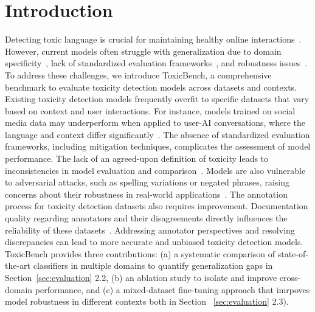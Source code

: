 \section{Introduction}
Detecting toxic language is crucial for maintaining healthy online interactions~\cite{schmidt-wiegand-2017-survey, mishra2020tacklingonlineabusesurvey}. However, current models often struggle with generalization due to domain specificity~\cite{niven-kao-2019-probing, ToxicChat}, lack of standardized evaluation frameworks~\cite{poletto2021resources, sap-etal-2019-risk}, and robustness issues~\cite{Hatecheck, hosseini2017deceiving}. To address these challenges, we introduce ToxicBench, a comprehensive benchmark to evaluate toxicity detection models across datasets and contexts.\newline
Existing toxicity detection models frequently overfit to specific datasets that vary based on context and user interactions. For instance, models trained on social media data may underperform when applied to user-AI conversations, where the language and context differ significantly~\cite{ToxicChat}.\newline
The absence of standardized evaluation frameworks, including mitigation techniques, complicates the assessment of model performance. The lack of an agreed-upon definition of toxicity leads to inconsistencies in model evaluation and comparison~\cite{poletto2021resources}. Models are also vulnerable to adversarial attacks, such as spelling variations or negated phrases, raising concerns about their robustness in real-world applications~\cite{hosseini2017deceiving}.\newline
The annotation process for toxicity detection datasets also requires improvement. Documentation quality regarding annotators and their disagreements directly influences the reliability of these datasets~\cite{waseem-2016-racist, sap-etal-2019-risk}. Addressing annotator perspectives and resolving discrepancies can lead to more accurate and unbiased toxicity detection models.\newline
ToxicBench provides three contributions: (a) a systematic comparison of state-of-the-art classifiers in multiple domains to quantify generalization gaps in Section~\ref{sec:evaluation} 2.2, (b) an ablation study to isolate and improve cross-domain performance, and (c) a mixed-dataset fine-tuning approach that imrpoves model robustness in different contexts both in Section ~\ref{sec:evaluation} 2.3).